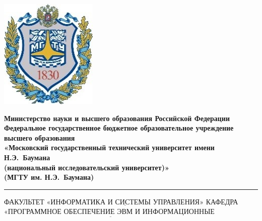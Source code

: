 \documentclass[12pt,a4paper,oneside]{report}
\begin{document}
	\thispagestyle{empty}
	\noindent \begin{minipage}{0.15\textwidth}
		\includegraphics[width=\linewidth]{b_logo}
	\end{minipage}
	\noindent\begin{minipage}{0.9\textwidth}\centering
		\textbf{Министерство науки и высшего образования Российской Федерации}\\
		\textbf{Федеральное государственное бюджетное образовательное учреждение высшего образования}\\
		\textbf{«Московский государственный технический университет имени Н.Э.~Баумана}\\
		\textbf{(национальный исследовательский университет)»}\\
		\textbf{(МГТУ им. Н.Э.~Баумана)}
	\end{minipage}
	\noindent\rule{18cm}{3pt}
	\newline\newline
	\noindent ФАКУЛЬТЕТ $\underline{\textbf{«ИНФОРМАТИКА И СИСТЕМЫ УПРАВЛЕНИЯ»}}$ \newline\newline
	\noindent КАФЕДРА $\underline{\textbf{«ПРОГРАММНОЕ ОБЕСПЕЧЕНИЕ ЭВМ И ИНФОРМАЦИОННЫЕ }}$\newline\newline
\end{document}
